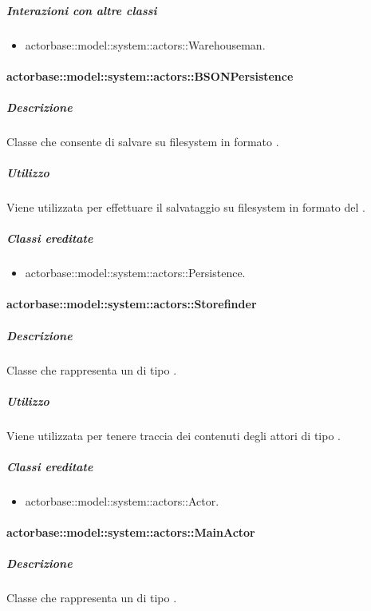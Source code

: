\documentclass{scalatekids-article}
\begin{document}
\subparagraph{Interazioni con altre classi}

\begin{itemize}
\item actorbase::model::system::actors::Warehouseman.
\end{itemize}

\paragraph{actorbase::model::system::actors::BSONPersistence}

\subparagraph{Descrizione}

Classe che consente di salvare su filesystem in formato .

\subparagraph{Utilizzo}

Viene utilizzata per effettuare il salvataggio su filesystem in formato
 del .

\subparagraph{Classi ereditate}

\begin{itemize}
\item actorbase::model::system::actors::Persistence.
\end{itemize}

\paragraph{actorbase::model::system::actors::Storefinder}

\subparagraph{Descrizione}

Classe che rappresenta un  di tipo .

\subparagraph{Utilizzo}

Viene utilizzata per tenere traccia dei contenuti degli attori di tipo
.

\subparagraph{Classi ereditate}

\begin{itemize}
\item actorbase::model::system::actors::Actor.
\end{itemize}

\paragraph{actorbase::model::system::actors::MainActor}

\subparagraph{Descrizione}

Classe che rappresenta un  di tipo .
\end{document}
